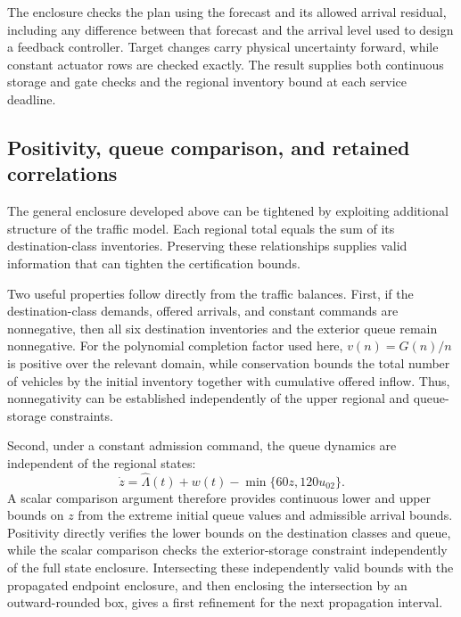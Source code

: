 \documentclass[journal,10pt]{IEEEtran}
\begin{document}
The enclosure checks the plan using the forecast and its allowed arrival
residual, including any difference between that forecast and the arrival
level used to design a feedback controller. Target changes carry physical
uncertainty forward, while constant actuator rows are checked exactly. The
result supplies both continuous storage and gate checks and the regional
inventory bound at each service deadline.

\subsection{Positivity, queue comparison, and retained correlations}
\label{sec:structure-certificate}

The general enclosure developed above can be tightened by exploiting additional
structure of the traffic model. Each regional total equals the sum of its
destination-class inventories. Preserving these relationships supplies valid
information that can tighten the certification bounds.

Two useful properties follow directly from the traffic balances. First, if the
destination-class demands, offered arrivals, and constant commands are
nonnegative, then all six destination inventories and the exterior queue remain
nonnegative. For the polynomial completion factor used here,
$v(n)=G(n)/n$ is positive over the relevant domain, while conservation bounds
the total number of vehicles by the initial inventory together with cumulative
offered inflow. Thus, nonnegativity can be established independently of the
upper regional and queue-storage constraints.

Second, under a constant admission command, the queue dynamics are independent
of the regional states:
\begin{equation}
 \dot z=\widehat\Lambda(t)+w(t)-\min\{60z,120u_{02}\}.
 \label{eq:structure-scalar-queue}
\end{equation}
A scalar comparison argument therefore provides continuous lower and upper
bounds on $z$ from the extreme initial queue values and admissible arrival
bounds. Positivity directly verifies the lower bounds on the destination
classes and queue, while the scalar comparison checks the exterior-storage
constraint independently of the full state enclosure. Intersecting these
independently valid bounds with the propagated endpoint enclosure, and then
enclosing the intersection by an outward-rounded box, gives a first
refinement for the next propagation interval.
\end{document}
